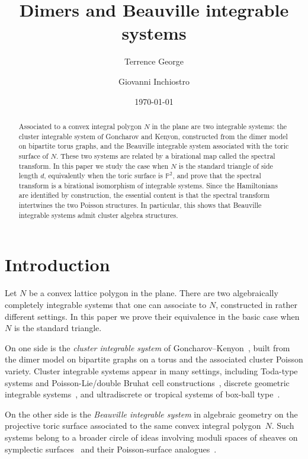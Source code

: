 \documentclass[dvipsnames,11pt]{article}
\theoremstyle{definition}
\renewcommand{\P}{{\mathbb P}}
\begin{document}
\title{Dimers and Beauville integrable systems}
\author{Terrence George \and Giovanni Inchiostro}

 \date{\today}

 \maketitle
 
 \begin{abstract}
Associated to a convex integral polygon $N$ in the plane are two integrable systems: the cluster integrable system of Goncharov and Kenyon, constructed from the dimer model on bipartite torus graphs, and the Beauville integrable system associated with the toric surface of $N$. These two systems are related by a birational map called the spectral transform. In this paper we study the case when $N$ is the standard triangle of side length $d$, equivalently when the toric surface is $\P^2$, and prove that the spectral transform is a birational isomorphism of integrable systems. Since the Hamiltonians are identified by construction, the essential content is that the spectral transform intertwines the two Poisson structures. In particular, this shows that Beauville integrable systems admit cluster algebra structures.
 \end{abstract}
\tableofcontents

\section{Introduction}
Let $N$ be a convex lattice polygon in the plane. There are two algebraically completely integrable systems that one can associate to $N$, constructed in rather different settings. In this paper we prove their equivalence in the basic case when $N$ is the standard triangle.

On one side is the \emph{cluster integrable system} of Goncharov--Kenyon~\cite{GK13}, built from the dimer model on bipartite graphs on a torus and the associated cluster Poisson variety. Cluster integrable systems appear in many settings, including Toda-type systems and Poisson-Lie/double Bruhat cell constructions~\cite{GSV,GSVToda,Williams,FockMarshakov,ILP}, discrete geometric integrable systems~\cite{GSTV2,GSTV,GlickPylyavskyy,Izo,AGR}, and ultradiscrete or tropical systems of box-ball type~\cite{IKT,LP}. 

On the other side is the \emph{Beauville integrable system} in algebraic geometry on the projective toric surface associated to the same convex integral polygon~$N$. Such systems belong to a broader circle of ideas involving moduli spaces of sheaves on symplectic surfaces~\cite{Mukai,Tyurin,Beauville} and their Poisson-surface analogues~\cite{Bottacin,Bott1}.
\end{document}
